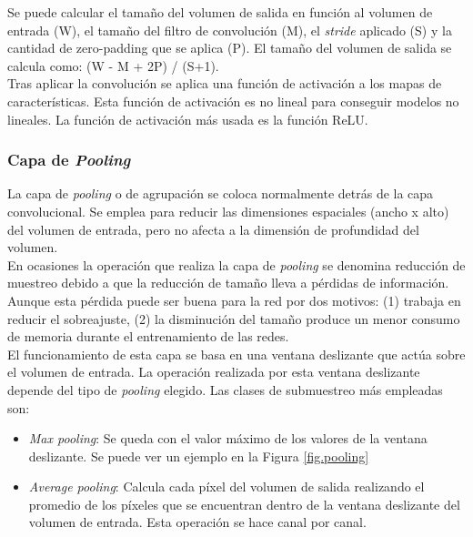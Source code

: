 Se puede calcular el tamaño del volumen de salida en función al volumen de entrada (W), el tamaño del filtro de convolución (M), el \textit{stride} aplicado (S) y la cantidad de zero-padding que se aplica (P). El tamaño del volumen de salida se calcula como: (W - M + 2P) / (S+1).\\


Tras aplicar la convolución se aplica una función de activación a los mapas de características. Esta función de activación es no lineal para conseguir modelos no lineales. La función de activación más usada es la función ReLU.


\subsubsection{Capa de \textit{Pooling}}

La capa de \textit{pooling} o de agrupación se coloca normalmente detrás de la capa convolucional. Se emplea para reducir las dimensiones espaciales (ancho x alto) del volumen de entrada, pero no afecta a la dimensión de profundidad del volumen.\\

En ocasiones la operación que realiza la capa de \textit{pooling} se denomina reducción de muestreo debido a que la reducción de tamaño lleva a pérdidas de información. Aunque esta pérdida puede ser buena para la red por dos motivos: (1) trabaja en reducir el sobreajuste, (2) la disminución del tamaño produce un menor consumo de memoria durante el entrenamiento de las redes.\\

El funcionamiento de esta capa se basa en una ventana deslizante que actúa sobre el volumen de entrada. La operación realizada por esta ventana deslizante depende del tipo de \textit{pooling} elegido. Las clases de submuestreo más empleadas son:

\begin{itemize}
    \item \textit{Max pooling}: Se queda con el valor máximo de los valores de la ventana deslizante. Se puede ver un ejemplo en la Figura \ref{fig.pooling}
    
    \item \textit{Average pooling}: Calcula cada píxel del volumen de salida realizando el promedio de los píxeles que se encuentran dentro de la ventana deslizante del volumen de entrada. Esta operación se hace canal por canal.
\end{itemize}

